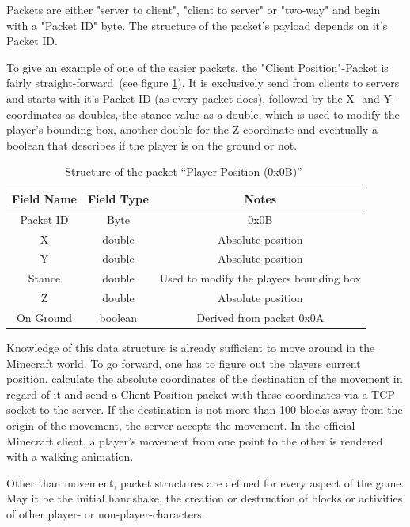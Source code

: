 
Packets are either "server to client", "client to server" or "two-way" and begin with a "Packet ID" byte. The structure of the packet's payload depends on it's Packet ID.
 
To give an example of one of the easier packets, the "Client Position"-Packet is fairly straight-forward~(see figure \ref{mc_packet}). It is exclusively send from clients to servers and starts with it's Packet ID (as every packet does), followed by the X- and Y-coordinates as doubles, the stance value as a double, which is used to modify the player's bounding box, another double for the Z-coordinate and eventually a boolean that describes if the player is on the ground or not.~\cite{protocol}

\begin{table}[htb]
\centering
\begin{tabular}{|c|c|c|}\hline

    Field Name & Field Type & Notes \\ \hline
   Packet ID & Byte & 0x0B \\ \hline
   X & double & Absolute position \\ \hline
   Y & double & Absolute position \\ \hline
   Stance & double & Used to modify the players bounding box \\ \hline
   Z & double & Absolute position \\ \hline
   On Ground & boolean & Derived from packet 0x0A \\ \hline
   
\end{tabular}
\caption{Structure of the packet ``Player Position (0x0B)''~\cite{protocol}}
\label{mc_packet}
\end{table}

Knowledge of this data structure is already sufficient to move around in the Minecraft world. To go forward, one has to figure out the players current position, calculate the absolute coordinates of the destination of the movement in regard of it and send a Client Position packet with these coordinates via a TCP socket to the server. If the destination is not more than 100 blocks away from the origin of the movement, the server accepts the movement. In the official Minecraft client, a player's movement from one point to the other is rendered with a walking animation.

Other than movement, packet structures are defined for every aspect of the game. May it be the initial handshake, the creation or destruction of blocks or activities of other player- or non-player-characters.


